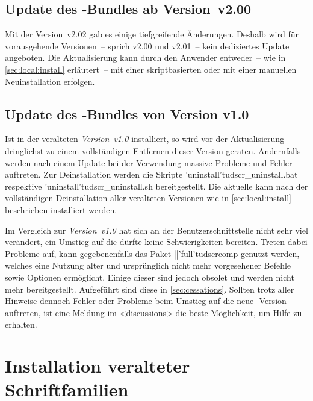 \subsection{Update des \TUDScript-Bundles ab Version~v2.00}

Mit der Version~v2.02 gab es einige tiefgreifende Änderungen. Deshalb wird für 
vorausgehende Versionen~-- sprich v2.00 und v2.01~-- kein dediziertes Update 
angeboten. Die Aktualisierung kann durch den Anwender entweder~-- wie in 
\autoref{sec:local:install} erläutert~-- mit einer skriptbasierten oder mit 
einer manuellen Neuinstallation erfolgen.%
%



\subsection{Update des \TUDScript-Bundles von Version v1.0}

Ist \TUDScript in der veralteten \emph{Version~v1.0} installiert, so wird vor 
der Aktualisierung dringlichst zu einem vollständigen Entfernen dieser Version 
geraten. Andernfalls werden nach einem Update bei der Verwendung massive 
Probleme und Fehler auftreten. Zur Deinstallation werden die Skripte 
\GitHubFile*'uninstall'{tudscr_uninstall.bat} respektive
\GitHubFile*'uninstall'{tudscr_uninstall.sh} bereitgestellt. Die aktuelle 
 kann nach der vollständigen Deinstallation aller 
veralteten Versionen wie in \autoref{sec:local:install} beschrieben installiert 
werden.

Im Vergleich zur \emph{Version~v1.0} hat sich an der Benutzerschnittstelle 
nicht sehr viel verändert, ein Umstieg auf die  dürfte 
keine Schwierigkeiten bereiten. Treten dabei Probleme auf, kann gegebenenfalls 
das Paket \Package||'full'{tudscrcomp} genutzt werden, welches eine Nutzung 
alter und ursprünglich nicht mehr vorgesehener Befehle sowie Optionen 
ermöglicht. Einige dieser sind jedoch obsolet und werden nicht mehr 
bereitgestellt. Aufgeführt sind diese in \autoref{sec:cessations}. Sollten 
trotz aller Hinweise dennoch Fehler oder Probleme beim Umstieg auf die neue 
\TUDScript-Version auftreten, ist eine Meldung im \GitHubRepo<discussions> die 
beste Möglichkeit, um Hilfe zu erhalten.



\section{%
  Installation veralteter Schriftfamilien%
  \label{sec:install:fonts}%
}

